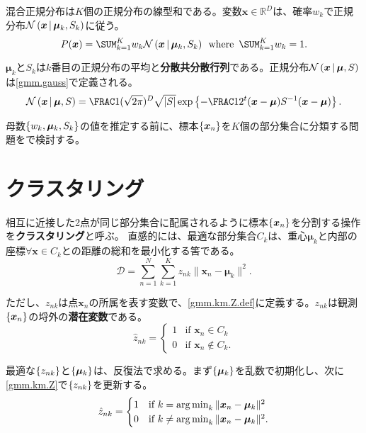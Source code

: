 \documentclass[10pt,a4paper]{book}
\begin{document}
混合正規分布は$K$個の正規分布の線型和である。変数$\bm{x}\!\in\!\mathbb{R}^D$は、確率$w_k$で正規分布$\mathcal{N}\left(\bm{x}\,\middle|\,\bm{\mu}_k,S_k\right)$に従う。
%
\begin{equation}
\label{eq:gmm}
P(\bm{x}) = \sum_{k=1}^K w_k \Nd{\bm{x}}{\bm{\mu}_k,S_k} \where\sum_{k=1}^K w_k = 1.
\end{equation}

$\bm{\mu}_k$と$S_k$は$k$番目の正規分布の平均と\textbf{分散共分散行列}である。正規分布$\mathcal{N}\left(\bm{x}\,\middle|\,\bm{\mu},S\right)$は\eqref{gmm.gauss}で定義される。
%
\begin{equation}
\label{eq:gmm.gauss}
\Nd{\bm{x}}{\bm{\mu},S} = \frac{1}{(\sqrt{2\pi})^D\sqrt{|S|}} \exp \left\{-\frac{1}{2} \trans{(\bm{x}-\bm{\mu})} S^{-1} (\bm{x}-\bm{\mu})\right\}.
\end{equation}

母数$\seq{w_k,\bm{\mu}_k,S_k}$の値を推定する前に、標本$\seq{\bm{x}_n}$を$K$個の部分集合に分類する問題をで検討する。

\section{クラスタリング\label{sect:gmm.km}}

相互に近接した2点が同じ部分集合に配属されるように標本$\seq{\bm{x}_n}$を分割する操作を\textbf{クラスタリング}と呼ぶ。
直感的には、最適な部分集合$C_k$は、重心$\bm{\mu}_k$と内部の座標$\forall{}\bm{x}\!\in\!C_k$との距離の総和を最小化する筈である。
%
\begin{equation}
\label{eq:gmm.km.D}
\mathcal{D} = \sum_{n=1}^N \sum_{k=1}^K z_{nk} \|\bm{x}_n-\bm{\mu}_k\|^2.
\end{equation}

ただし、$z_{nk}$は点$\bm{x}_n$の所属を表す変数で、\eqref{gmm.km.Z.def}に定義する。$z_{nk}$は観測$\seq{\bm{x}_n}$の埒外の\textbf{潜在変数}である。
%
\begin{equation}
\label{eq:gmm.km.Z.def}
\hat{z}_{nk} =
\begin{cases}
1& \text{if $\bm{x}_n     \in C_k$}\\
0& \text{if $\bm{x}_n \not\in C_k$}.
\end{cases}
\end{equation}

最適な$\seq{z_{nk}}$と$\seq{\bm{\mu}_k}$は、反復法で求める。まず$\seq{\bm{\mu}_k}$を乱数で初期化し、次に\eqref{gmm.km.Z}で$\seq{z_{nk}}$を更新する。
%
\begin{equation}
\label{eq:gmm.km.Z}
\hat{z}_{nk} =
\begin{cases}
1& \text{if $k=   \operatorname*{arg\,min}_{k}\|\bm{x}_n-\bm{\mu}_k\|^2$}\\
0& \text{if $k\neq\operatorname*{arg\,min}_{k}\|\bm{x}_n-\bm{\mu}_k\|^2$}.
\end{cases}
\end{equation}
\end{document}
